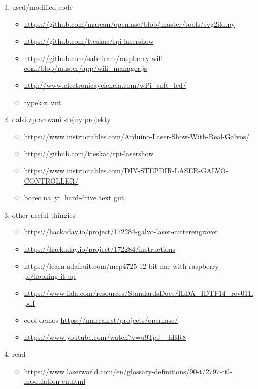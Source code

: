 \begin{enumerate}
  \item used/modified code
        \begin{itemize}
          \item \url{https://github.com/marcan/openlase/blob/master/tools/svg2ild.py}
          \item \url{https://github.com/tteskac/rpi-lasershow}
          \item \url{https://github.com/sabhiram/raspberry-wifi-conf/blob/master/app/wifi\_manager.js}
          \item \url{http://www.electronicayciencia.com/wPi_soft_lcd/}
          \item \href{https://dspace.vutbr.cz/bitstream/handle/11012/38621/final-thesis.pdf?sequence=-1}{typek z~vut}
        \end{itemize}
  \item dalsi zpracovani stejny projekty
        \begin{itemize}
          \item \url{https://www.instructables.com/Arduino-Laser-Show-With-Real-Galvos/}
          \item \url{https://github.com/tteskac/rpi-lasershow}
          \item \url{https://www.instructables.com/DIY-STEPDIR-LASER-GALVO-CONTROLLER/}
          \item \href{https://youtu.be/u9TpJ-_hBR8?si=mHy-UrptZZJ0Xu5-}{borec na~yt~hard-drive text gut}
        \end{itemize}
  \item other useful thingies
        \begin{itemize}
          \item \url{https://hackaday.io/project/172284-galvo-laser-cutterengraver}

          \item \url{https://hackaday.io/project/172284/instructions}

          \item \url{https://learn.adafruit.com/mcp4725-12-bit-dac-with-raspberry-pi/hooking-it-up}
          \item \url{https://www.ilda.com/resources/StandardsDocs/ILDA_IDTF14_rev011.pdf}
          \item cool demos \url{https://marcan.st/projects/openlase/}
          \item \url{https://www.youtube.com/watch?v=u9TpJ-_hBR8}
        \end{itemize}
  \item read
        \begin{itemize}
          \item \url{https://www.laserworld.com/en/glossary-definitions/90-t/2797-ttl-modulation-en.html}
        \end{itemize}

\end{enumerate}
